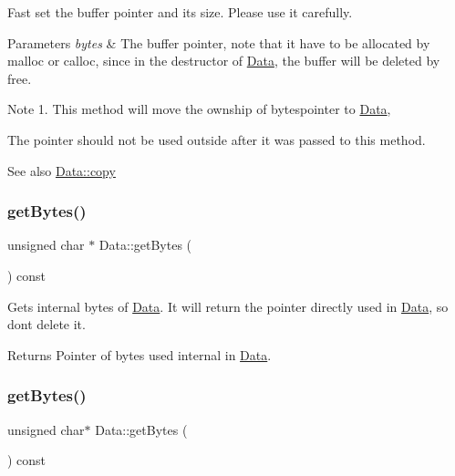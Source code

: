 Fast set the buffer pointer and its size. Please use it carefully. 
\begin{DoxyParams}{Parameters}
{\em bytes} & The buffer pointer, note that it have to be allocated by \textquotesingle{}malloc\textquotesingle{} or \textquotesingle{}calloc\textquotesingle{}, since in the destructor of \hyperlink{classData}{Data}, the buffer will be deleted by \textquotesingle{}free\textquotesingle{}. \\
\hline
\end{DoxyParams}
\begin{DoxyNote}{Note}
1. This method will move the ownship of \textquotesingle{}bytes\textquotesingle{}pointer to \hyperlink{classData}{Data},
\begin{DoxyEnumerate}
\item The pointer should not be used outside after it was passed to this method. 
\end{DoxyEnumerate}
\end{DoxyNote}
\begin{DoxySeeAlso}{See also}
\hyperlink{classData_a11d09c86fa7696d0cd89c0fe08970bf8}{Data\+::copy} 
\end{DoxySeeAlso}
\mbox{\label{classData_a677f15e70114b7af021355b3b2618770}} 
\subsubsection{\texorpdfstring{get\+Bytes()}{getBytes()}\hspace{0.1cm}{\footnotesize\ttfamily [1/2]}}
{\footnotesize\ttfamily unsigned char $\ast$ Data\+::get\+Bytes (\begin{DoxyParamCaption}{ }\end{DoxyParamCaption}) const}

Gets internal bytes of \hyperlink{classData}{Data}. It will return the pointer directly used in \hyperlink{classData}{Data}, so don\textquotesingle{}t delete it.

\begin{DoxyReturn}{Returns}
Pointer of bytes used internal in \hyperlink{classData}{Data}. 
\end{DoxyReturn}
\mbox{\label{classData_a34c414f43011e51e3dfb116d7c5ea7fb}} 
\subsubsection{\texorpdfstring{get\+Bytes()}{getBytes()}\hspace{0.1cm}{\footnotesize\ttfamily [2/2]}}
{\footnotesize\ttfamily unsigned char$\ast$ Data\+::get\+Bytes (\begin{DoxyParamCaption}{ }\end{DoxyParamCaption}) const}

